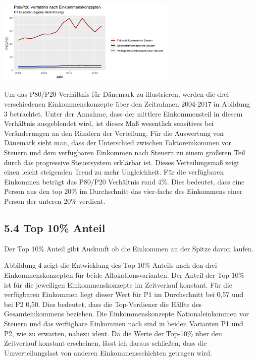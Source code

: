 \documentclass[12pt,]{article}
\let\origfigure\figure
\let\endorigfigure\endfigure
\renewenvironment{figure}[1][2] {
        \expandafter\origfigure\expandafter[H]
      } {\endorigfigure}
\begin{document}
\begin{figure}
\centering
\includegraphics[width=0.65000\textwidth]{img/8020.png}
\caption{P80/P20 Verhältnis, 2004-2017}
\end{figure}

Um das P80/P20 Verhältnis für Dänemark zu illustrieren, werden die drei
verschiedenen Einkommenskonzepte über den Zeitrahmen 2004-2017 in
Abildung 3 betrachtet. Unter der Annahme, dass der mittlere
Einkommensteil in diesem Verhältnis ausgeblendet wird, ist dieses Maß
wesentlich sensitives bei Veränderungen an den Rändern der Verteilung.
Für die Auswertung von Dänemark sieht man, dass der Unterschied zwischen
Faktoreinkommen vor Steuern und dem verfügbaren Einkommen nach Steuern
zu einem größeren Teil durch das progressive Steuersystem erklärbar ist.
Dieses Verteilungsmaß zeigt einen leicht steigenden Trend zu mehr
Ungleichheit. Für die verfügbaren Einkommen beträgt das P80/P20
Verhältnis rund 4\%. Dies bedeutet, dass eine Person aus den top 20\% im
Durchschnitt das vier-fache des Einkommens einer Person der unteren 20\%
verdient.

\subsection{5.4 Top 10\% Anteil}\label{top-10-anteil}

Der Top 10\% Anteil gibt Auskunft ob die Einkommen an der Spitze davon
laufen.

Abbildung 4 zeigt die Entwicklung des Top 10\% Anteils nach den drei
Einkommenskonzepten für beide Allokationsvarianten. Der Anteil der Top
10\% ist für die jeweiligen Einkommenskonzepte im Zeitverlauf konstant.
Für die verfügbaren Einkommen liegt dieser Wert für P1 im Durchschnitt
bei 0,57 und bei P2 0,50. Dies bedeutet, dass die Top-Verdiener die
Hälfte des Gesamteinkommens beziehen. Die Einkommenskonzepte
Nationaleinkommen vor Steuern und das verfügbare Einkommen nach sind in
beiden Varianten P1 und P2, wie zu erwarten, nahezu ident. Da die Werte
der Top-10\% über den Zeitverlauf konstant erscheinen, lässt ich daraus
schließen, dass die Umverteilungslast von anderen Einkommensschichten
getragen wird.
\end{document}
